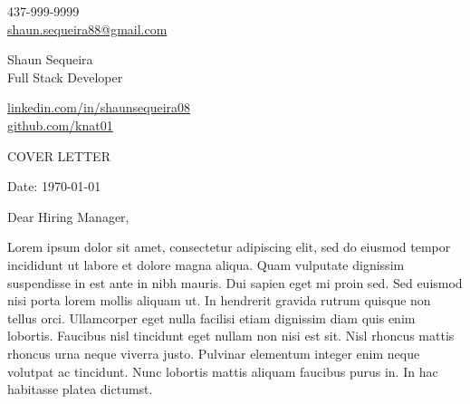 


\begin{center}
    \begin{minipage}[b]{0.24\textwidth}
            \large 437-999-9999 \\
            \large \href{mailto:shaun.sequeira88@gmail.com}{shaun.sequeira88@gmail.com} 
    \end{minipage}%
    \begin{minipage}[b]{0.5\textwidth}
            \centering
            {\Huge Shaun Sequeira} \\ %
            \vspace{0.1cm}
            {\color{UI_blue} \Large{Full Stack Developer}} \\
    \end{minipage}%
    \begin{minipage}[b]{0.24\textwidth}
            \flushright \large
            {\href{https://www.linkedin.com/in/shaunsequeira08/}{linkedin.com/in/shaunsequeira08} } \\
            \href{https://github.com/knat01}{github.com/knat01}
    \end{minipage}   
    
\vspace{-0.15cm} 
{\color{UI_blue} \hrulefill}
\end{center}

\justify
\setlength{\parindent}{0pt}
\setlength{\parskip}{12pt}
\vspace{0.2cm}
\begin{center}
    {\color{UI_blue} \Large{COVER LETTER}}
\end{center}



Date: \today \par \vspace{-0.1cm}
Dear Hiring Manager, %

Lorem ipsum dolor sit amet, consectetur adipiscing elit, sed do eiusmod tempor incididunt ut labore et dolore magna aliqua. Quam vulputate dignissim suspendisse in est ante in nibh mauris. Dui sapien eget mi proin sed. Sed euismod nisi porta lorem mollis aliquam ut. In hendrerit gravida rutrum quisque non tellus orci. Ullamcorper eget nulla facilisi etiam dignissim diam quis enim lobortis. Faucibus nisl tincidunt eget nullam non nisi est sit. Nisl rhoncus mattis rhoncus urna neque viverra justo. Pulvinar elementum integer enim neque volutpat ac tincidunt. Nunc lobortis mattis aliquam faucibus purus in. In hac habitasse platea dictumst. \par

